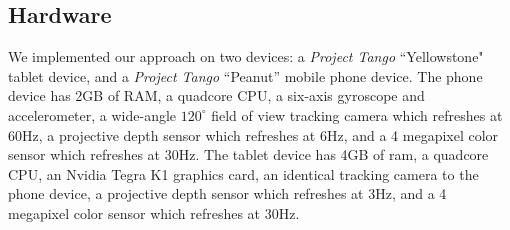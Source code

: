 \documentclass[10pt,twocolumn,letterpaper]{article}
\begin{document}
\subsection{Hardware}
\label{section:hardware}
We implemented our approach on two devices: a \textit{Project Tango}
``Yellowstone" tablet device, and a \textit{Project Tango} ``Peanut'' mobile 
phone device. The phone device has 2GB of RAM, a quadcore
CPU, a six-axis gyroscope and accelerometer, a wide-angle $120^\circ$ field of
view tracking camera which refreshes at 60Hz, a projective depth sensor which
refreshes at 6Hz, and a 4 megapixel color sensor which refreshes at 30Hz. The
tablet device has 4GB of ram, a quadcore CPU, an Nvidia Tegra K1 graphics card,
an identical tracking camera to the phone device, a projective depth sensor
which refreshes at 3Hz, and a 4 megapixel color sensor which refreshes at 30Hz.
\end{document}
